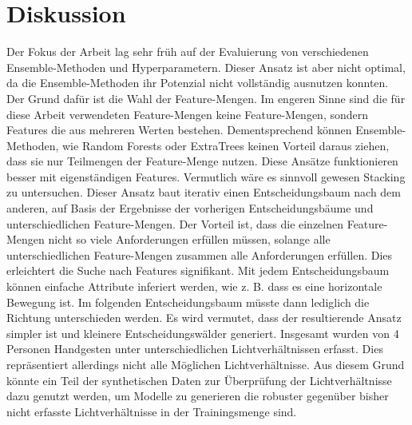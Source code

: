 \chapter{Diskussion}
Der Fokus der Arbeit lag sehr früh auf der Evaluierung von verschiedenen Ensemble-Methoden und Hyperparametern. Dieser Ansatz ist aber nicht optimal, da die Ensemble-Methoden ihr Potenzial nicht vollständig
ausnutzen konnten. Der Grund dafür ist die Wahl der Feature-Mengen. Im engeren Sinne sind die für diese Arbeit verwendeten Feature-Mengen keine Feature-Mengen, sondern Features die aus mehreren Werten
bestehen. Dementsprechend können Ensemble-Methoden, wie Random Forests oder ExtraTrees keinen Vorteil daraus ziehen, dass sie nur Teilmengen der Feature-Menge nutzen.
Diese Ansätze funktionieren besser mit eigenständigen Features.
\newline
\newline
Vermutlich wäre es sinnvoll gewesen Stacking zu untersuchen. Dieser Ansatz baut iterativ einen Entscheidungsbaum nach dem anderen, auf Basis der Ergebnisse der vorherigen Entscheidungsbäume und
unterschiedlichen Feature-Mengen. Der Vorteil ist, dass die einzelnen Feature-Mengen nicht so viele Anforderungen erfüllen müssen, solange alle unterschiedlichen Feature-Mengen zusammen alle
Anforderungen erfüllen. Dies erleichtert die Suche nach Features signifikant. Mit jedem Entscheidungsbaum können einfache Attribute inferiert werden, wie z. B. dass es eine horizontale Bewegung ist.
Im folgenden Entscheidungsbaum müsste dann lediglich die Richtung unterschieden werden. Es wird vermutet, dass der resultierende Ansatz simpler ist und kleinere Entscheidungswälder generiert.
\newline
\newline
Insgesamt wurden von 4 Personen Handgesten unter unterschiedlichen Lichtverhältnissen erfasst. Dies repräsentiert allerdings nicht alle Möglichen Lichtverhältnisse. Aus diesem Grund könnte ein
Teil der synthetischen Daten zur Überprüfung der Lichtverhältnisse dazu genutzt werden, um Modelle zu generieren die robuster gegenüber bisher nicht erfasste Lichtverhältnisse in der Trainingsmenge sind.